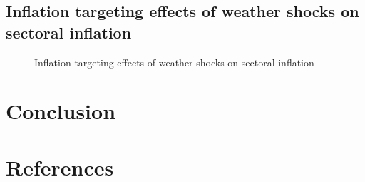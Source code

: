 \documentclass[
  letterpaper,
  DIV=11,
  numbers=noendperiod]{scrartcl}
\begin{document}
\subsection{Inflation targeting effects of weather shocks on sectoral
inflation}\label{inflation-targeting-effects-of-weather-shocks-on-sectoral-inflation}

\begin{figure}[H]


\caption{\label{fig-inflation_targeting_direct}Inflation targeting
effects of weather shocks on sectoral inflation}

\end{figure}%

\section{Conclusion}\label{conclusion}

\newpage

\section*{References}\label{references}

\renewcommand{\bibsection}{}


\setcounter{section}{0}
\renewcommand{\thesection}{\Alph{section}}

\setcounter{table}{0}
\renewcommand{\thetable}{A\arabic{table}}

\setcounter{figure}{0}
\renewcommand{\thefigure}{A\arabic{figure}}
\end{document}
